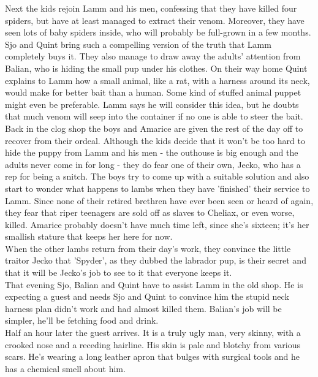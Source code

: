 Next the kids rejoin Lamm and his men, confessing that they have killed four spiders, but have at least managed to extract their venom. Moreover, they have seen lots of baby spiders inside, who will probably be full-grown in a few months. Sjo and Quint bring such a compelling version of the truth that Lamm completely buys it. They also manage to draw away the adults' attention from Balian, who is hiding the small pup under his clothes. On their way home Quint explains to Lamm how a small animal, like a rat, with a harness around its neck, would make for better bait than a human. Some kind of stuffed animal puppet might even be preferable. Lamm says he will consider this idea, but he doubts that much venom will seep into the container if no one is able to steer the bait.\\

Back in the clog shop the boys and Amarice are given the rest of the day off to recover from their ordeal. Although the kids decide that it won't be too hard to hide the puppy from Lamm and his men - the outhouse is big enough and the adults never come in for long - they do fear one of their own, Jecko, who has a rep for being a snitch. The boys try to come up with a suitable solution and also start to wonder what happens to lambs when they have 'finished' their service to Lamm. Since none of their retired brethren have ever been seen or heard of again, they fear that riper teenagers are sold off as slaves to Cheliax, or even worse, killed. Amarice probably doesn't have much time left, since she's sixteen; it's her smallish stature that keeps her here for now.\\

When the other lambs return from their day's work, they convince the little traitor Jecko that 'Spyder', as they dubbed the labrador pup, is their secret and that it will be Jecko's job to see to it that everyone keeps it.\\

That evening Sjo, Balian and Quint have to assist Lamm in the old shop. He is expecting a guest and needs Sjo and Quint to convince him the stupid neck harness plan didn't work and had almost killed them. Balian's job will be simpler, he'll be fetching food and drink.\\

Half an hour later the guest arrives. It is a truly ugly man, very skinny, with a crooked nose and a receding hairline. His skin is pale and blotchy from various scars. He's wearing a long leather apron that bulges with surgical tools and he has a chemical smell about him.\\


